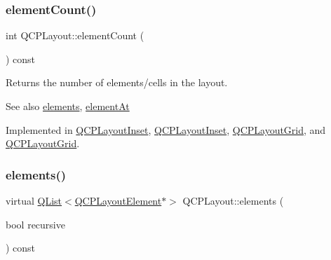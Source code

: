 \mbox{\label{class_q_c_p_layout_a39d3e9ef5d9b82ab1885ba1cb9597e56}} 
\subsubsection{\texorpdfstring{element\+Count()}{elementCount()}}
{\footnotesize\ttfamily int Q\+C\+P\+Layout\+::element\+Count (\begin{DoxyParamCaption}{ }\end{DoxyParamCaption}) const\hspace{0.3cm}{\ttfamily [pure virtual]}}

Returns the number of elements/cells in the layout.

\begin{DoxySeeAlso}{See also}
\hyperlink{class_q_c_p_layout_aca129722c019f91d3367046f80abfa77}{elements}, \hyperlink{class_q_c_p_layout_afa73ca7d859f8a3ee5c73c9b353d2a56}{element\+At} 
\end{DoxySeeAlso}


Implemented in \hyperlink{class_q_c_p_layout_inset_a7f5aa4d48a2e844cfe6dd7ed8f0861df}{Q\+C\+P\+Layout\+Inset}, \hyperlink{class_q_c_p_layout_inset_a4096aa1dc77ff54fc76df8e30b6d9e1b}{Q\+C\+P\+Layout\+Inset}, \hyperlink{class_q_c_p_layout_grid_a9a8942aface780a02445ebcf14c48513}{Q\+C\+P\+Layout\+Grid}, and \hyperlink{class_q_c_p_layout_grid_a9a8942aface780a02445ebcf14c48513}{Q\+C\+P\+Layout\+Grid}.

\mbox{\label{class_q_c_p_layout_a15d7ab417316952a13bed428819af690}} 
\subsubsection{\texorpdfstring{elements()}{elements()}\hspace{0.1cm}{\footnotesize\ttfamily [1/2]}}
{\footnotesize\ttfamily virtual \hyperlink{class_q_list}{Q\+List}$<$\hyperlink{class_q_c_p_layout_element}{Q\+C\+P\+Layout\+Element}$\ast$$>$ Q\+C\+P\+Layout\+::elements (\begin{DoxyParamCaption}\item[{bool}]{recursive }\end{DoxyParamCaption}) const\hspace{0.3cm}{\ttfamily [virtual]}}

